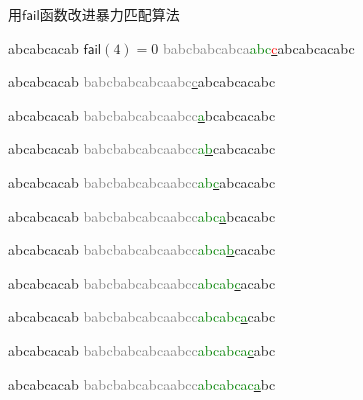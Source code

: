 \documentclass{ctexbeamer}
\newcommand{\ul}[1]{\underline{#1}}
\newcommand{\red}[1]{\textcolor{red}{#1}}
\newcommand{\green}[1]{\textcolor{green}{#1}}
\newcommand{\gray}[1]{\textcolor{gray}{#1}}
\newcommand{\fail}{\mathsf{fail}}
\newcommand{\ugrn}[1]{\underline{\green{#1}}}
\newcommand{\ured}[1]{\underline{\red{#1}}}
\begin{document}
\begin{frame}[fragile]{用$\fail$函数改进暴力匹配算法}
\begin{minipage}[t]{0.33\textwidth}
\begin{tverb}[fontsize=\tiny]
            abcabcacab \(\scriptstyle\fail(4)=0\)
\gray{babcbabcabca}\green{abc}\ured{c}abcabcacabc
\end{tverb}

\begin{tverb}[fontsize=\tiny]
                abcabcacab
\gray{babcbabcabcaabc}\ul{\gray{c}}abcabcacabc
\end{tverb}

\end{minipage}%
%
\begin{minipage}[t]{.33\textwidth}

\begin{tverb}[fontsize=\tiny]
                abcabcacab
\gray{babcbabcabcaabcc}\ugrn{a}bcabcacabc
\end{tverb}

\begin{tverb}[fontsize=\tiny]
                abcabcacab
\gray{babcbabcabcaabcc}\green{a}\ugrn{b}cabcacabc
\end{tverb}

\begin{tverb}[fontsize=\tiny]
                abcabcacab
\gray{babcbabcabcaabcc}\green{ab}\ugrn{c}abcacabc
\end{tverb}

\begin{tverb}[fontsize=\tiny]
                abcabcacab
\gray{babcbabcabcaabcc}\green{abc}\ugrn{a}bcacabc
\end{tverb}

\begin{tverb}[fontsize=\tiny]
                abcabcacab
\gray{babcbabcabcaabcc}\green{abca}\ugrn{b}cacabc
\end{tverb}

\begin{tverb}[fontsize=\tiny]
                abcabcacab
\gray{babcbabcabcaabcc}\green{abcab}\ugrn{c}acabc
\end{tverb}

\begin{tverb}[fontsize=\tiny]
                abcabcacab
\gray{babcbabcabcaabcc}\green{abcabc}\ugrn{a}cabc
\end{tverb}

\begin{tverb}[fontsize=\tiny]
                abcabcacab
\gray{babcbabcabcaabcc}\green{abcabca}\ugrn{c}abc
\end{tverb}

\begin{tverb}[fontsize=\tiny]
                abcabcacab
\gray{babcbabcabcaabcc}\green{abcabcac}\ugrn{a}bc
\end{tverb}


\end{minipage}
\end{frame}
\end{document}
